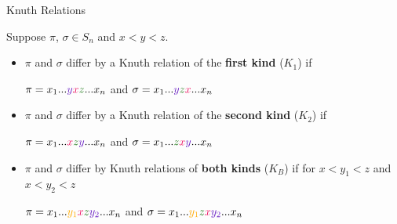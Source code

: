\documentclass[aspectratio=169, serif]{beamer}
\begin{document}
\begin{frame}{Knuth Relations}
    \begin{definition}
        Suppose $\pi$, $\sigma \in S_n$ and $x<y<z$.
            \begin{itemize}
                \item $\pi$ and $\sigma$ differ by a Knuth relation of the \textbf{first kind} ($K_1$) if \begin{center} $\pi=x_1...\textcolor{purple}{y}\textcolor{red}{x}\textcolor{pink}{z}...x_n$ and $\sigma=x_1...\textcolor{purple}{y}\textcolor{pink}{z}\textcolor{red}{x}...x_n$ \end{center} 
                
                \item $\pi$ and $\sigma$ differ by a Knuth relation of the \textbf{second kind} ($K_2$) if \begin{center} $\pi=x_1...\textcolor{red}{x}\textcolor{pink}{z}\textcolor{purple}{y}...x_n$ and $\sigma=x_1...\textcolor{pink}{z}\textcolor{red}{x}\textcolor{purple}{y}...x_n$ \end{center}  
                
                \item $\pi$ and $\sigma$ differ by Knuth relations of \textbf{both kinds} ($K_B$) if for $x<y_1<z$ and  $x<y_2<z$\begin{center} $\pi=x_1...\textcolor{yellow}{y_1}\textcolor{red}{x}\textcolor{pink}{z}\textcolor{purple}{y_2}...x_n$ and $\sigma=x_1...\textcolor{yellow}{y_1}\textcolor{pink}{z}\textcolor{red}{x}\textcolor{purple}{y_2}...x_n$ \end{center}
            \end{itemize}
    \end{definition}
\end{frame}
\end{document}
